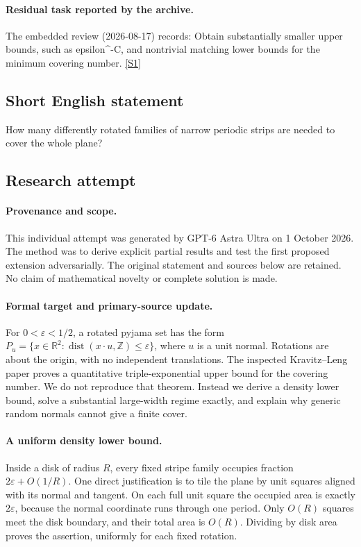 \documentclass[11pt,a4paper]{article}
\newcommand{\Z}{\mathbb{Z}}
\newcommand{\R}{\mathbb{R}}
\newcommand{\sref}[2]{\hyperlink{source:#1:#2}{[S#2]}}
\begin{document}
\paragraph{Residual task reported by the archive.}

The embedded review (2026-08-17) records: Obtain substantially smaller upper bounds, such as epsilon\textasciicircum{}{-C}, and nontrivial matching lower bounds for the minimum covering number. \sref{171}{1}

\subsection{Short English statement}

How many differently rotated families of narrow periodic strips are needed to cover the whole plane?

\subsection{Research attempt}

\paragraph{Provenance and scope.}
This individual attempt was generated by GPT-6 Astra Ultra on 1 October 2026. The method was to derive explicit partial results and test the first proposed extension adversarially. The original statement and sources below are retained. No claim of mathematical novelty or complete solution is made.

\paragraph{Formal target and primary-source update.}
For $0<\varepsilon<1/2$, a rotated pyjama set has the form $P_u=\{x\in\R^2:\operatorname{dist}(x\cdot u,\Z)\leq\varepsilon\}$, where $u$ is a unit normal. Rotations are about the origin, with no independent translations. The inspected Kravitz--Leng paper proves a quantitative triple-exponential upper bound for the covering number. We do not reproduce that theorem. Instead we derive a density lower bound, solve a substantial large-width regime exactly, and explain why generic random normals cannot give a finite cover.

\paragraph{A uniform density lower bound.}
Inside a disk of radius $R$, every fixed stripe family occupies fraction $2\varepsilon+O(1/R)$. One direct justification is to tile the plane by unit squares aligned with its normal and tangent. On each full unit square the occupied area is exactly $2\varepsilon$, because the normal coordinate runs through one period. Only $O(R)$ squares meet the disk boundary, and their total area is $O(R)$. Dividing by disk area proves the assertion, uniformly for each fixed rotation.
\end{document}
